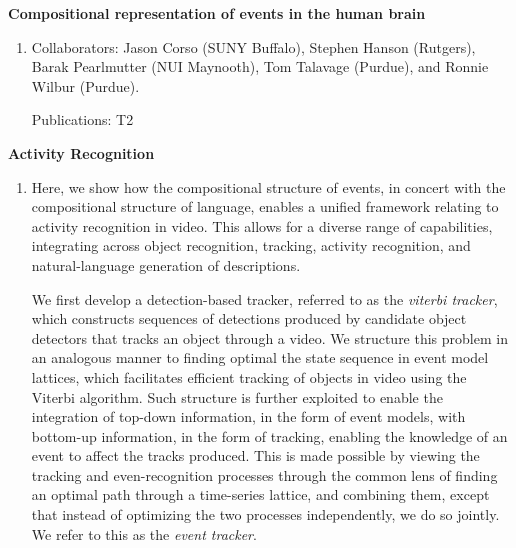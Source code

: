 \documentclass[10pt]{article}
\newenvironment{researchBlock}[1]{%
  \vspace*{0.5ex}
  {\large \textbf{#1}}
  \begin{enumerate}\item[]}
  {\end{enumerate}}
\newcommand{\refr}[1]{{\color{RoyalBlue} #1}}
\begin{document}
\begin{researchBlock} {Compositional representation of events in the human brain}
  Collaborators: Jason Corso (SUNY Buffalo), Stephen Hanson (Rutgers), Barak Pearlmutter (NUI Maynooth),
  Tom Talavage (Purdue), and Ronnie Wilbur (Purdue).

  Publications: \refr{T2}
\end{researchBlock}

\begin{researchBlock} {Activity Recognition}

  Here, we show how the compositional structure of events, in concert with the
  compositional structure of language, enables a unified framework relating to
  activity recognition in video.
  This allows for a diverse range of capabilities, integrating across object
  recognition, tracking, activity recognition, and natural-language generation
  of descriptions.

  We first develop a detection-based tracker, referred to as the \emph{viterbi
    tracker}, which constructs sequences of detections produced by candidate
  object detectors that tracks an object through a video.
  We structure this problem in an analogous manner to finding optimal the state
  sequence in event model lattices, which facilitates efficient tracking of
  objects in video using the Viterbi algorithm.
  Such structure is further exploited to enable the integration of top-down
  information, in the form of event models, with bottom-up information, in the
  form of tracking, enabling the knowledge of an event to affect the tracks
  produced.
  This is made possible by viewing the tracking and even-recognition processes
  through the common lens of finding an optimal path through a time-series
  lattice, and combining them, except that instead of optimizing the two
  processes independently, we do so jointly.
  We refer to this as the \emph{event tracker}.


\end{researchBlock}
\end{document}
